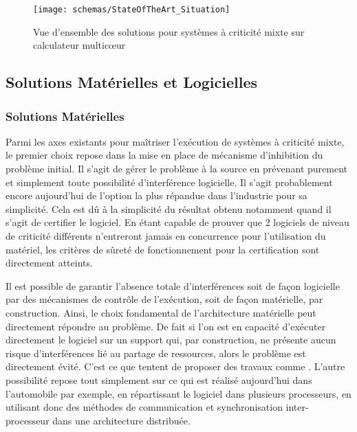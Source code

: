 \documentclass[french, a4paper, 11pt, twoside, pdftex]{StyleThese}
\begin{document}
    \begin{figure}[ht]
    	\centering
    	\texttt{[image: schemas/StateOfTheArt\_Situation]}
    	\captionsetup{justification=centering}
    	\caption{Vue d'ensemble des solutions pour systèmes à criticité mixte sur calculateur multicœur}
    	\label{fig:stateoftheartsituation}
    \end{figure}

    \subsection{Solutions Matérielles et Logicielles}
    
    \subsubsection{Solutions Matérielles}
    Parmi les axes existants pour maîtriser l'exécution de systèmes à criticité mixte, le premier choix repose dans la mise en place de mécanisme d'inhibition du problème initial. Il s'agit de gérer le problème à la source en prévenant purement et simplement toute possibilité d'interférence logicielle. Il s'agit probablement encore aujourd'hui de l'option la plus répandue dans l'industrie pour sa simplicité. Cela est dû à la simplicité du résultat obtenu notamment quand il s'agit de certifier le logiciel. En étant capable de prouver que 2 logiciels de niveau de criticité différents n'entreront jamais en concurrence pour l'utilisation du matériel, les critères de sûreté de fonctionnement pour la certification sont directement atteints.
    
    Il est possible de garantir l'absence totale d'interférences soit de façon logicielle par des mécanismes de contrôle de l'exécution, soit de façon matérielle, par construction. Ainsi, le choix fondamental de l'architecture matérielle peut directement répondre au problème. De fait si l'on est en capacité d'exécuter directement le logiciel sur un support qui, par construction, ne présente aucun risque d'interférences lié au partage de ressources, alors le problème est directement évité. C'est ce que tentent de proposer des travaux comme \cite{schoeberl_towards_2011}. L'autre possibilité repose tout simplement sur ce qui est réalisé aujourd'hui dans l'automobile par exemple, en répartissant le logiciel dans plusieurs processeurs, en utilisant donc des méthodes de communication et synchronisation inter-processeur dans une architecture distribuée.
    
\end{document}
